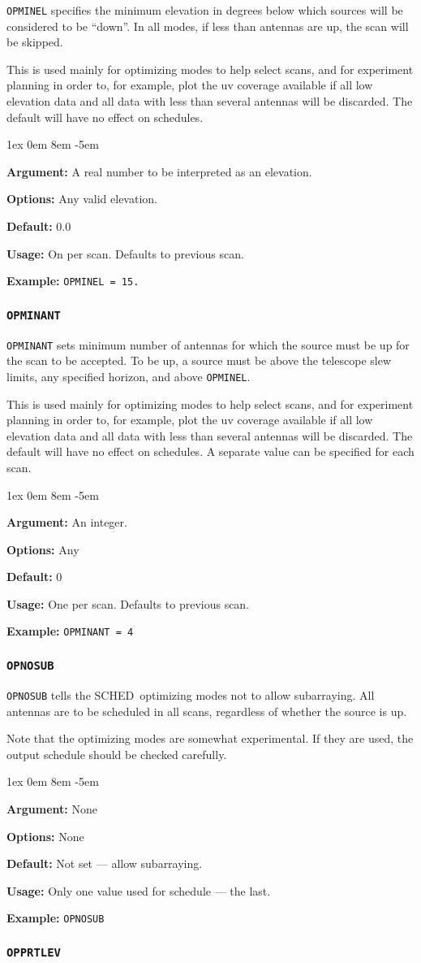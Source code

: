 \documentclass{report}
\newcommand{\schedb}{{\sc SCHED~}}
\newcommand{\rcwbox}[5]{
  \begin{list}{}{\parsep 1ex  \itemsep 0em
                 \leftmargin 8em  \itemindent -5em }
    \item {\bf Argument:} #1
    \item {\bf Options:}  #2
    \item {\bf Default:}  #3
    \item {\bf Usage:}    #4
    \item {\bf Example:}  #5
  \end{list}
}
\begin{document}
{\tt OPMINEL} specifies the minimum elevation in degrees below which
sources will be considered to be ``down''.  In all modes, if less than
 antennas are up, the scan will
be skipped.

This is used mainly for optimizing modes to help select scans, and
for experiment planning in order to, for example, plot the uv
coverage available if all low elevation data and all data with less
than several antennas will be discarded.  The default will have no
effect on schedules.

\rcwbox
{A real number to be interpreted as an elevation.}
{Any valid elevation.}
{0.0}
{On per scan.  Defaults to previous scan.}
{{\tt OPMINEL = 15.}}


\subsubsection{\label{MP:OPMINANT}{\tt OPMINANT}}

{\tt OPMINANT} sets minimum number of antennas for which the
source must be up for the scan to be accepted.  To be up, a source
must be above the telescope slew limits, any specified horizon, and
above {\tt OPMINEL}.

This is used mainly for optimizing modes to help select scans, and
for experiment planning in order to, for example, plot the uv
coverage available if all low elevation data and all data with less
than several antennas will be discarded.  The default will have no
effect on schedules.  A separate value can be specified for each
scan.

\rcwbox
{An integer. }
{Any}
{0}
{One per scan.  Defaults to previous scan.}
{{\tt OPMINANT = 4}}


\subsubsection{\label{MP:OPNOSUB}{\tt OPNOSUB}}

{\tt OPNOSUB} tells the \schedb optimizing modes not to allow
subarraying.  All antennas are to be scheduled in all scans, regardless
of whether the source is up.

Note that the optimizing modes are somewhat experimental.  If they are
used, the output schedule should be checked carefully.

\rcwbox
{None}
{None}
{Not set --- allow subarraying.}
{Only one value used for schedule --- the last.}
{{\tt OPNOSUB}}


\subsubsection{\label{MP:OPPRTLEV}{\tt OPPRTLEV}}
\end{document}
